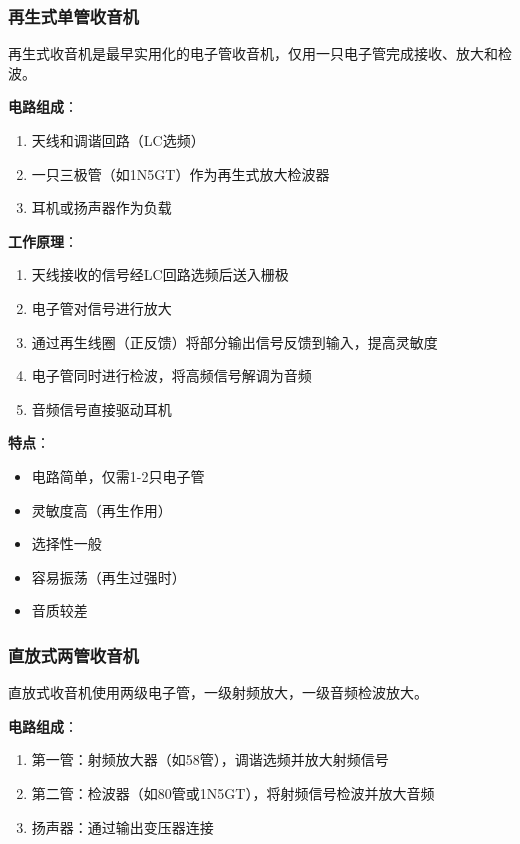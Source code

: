\subsubsection{再生式单管收音机}
\label{sec:regenerative_radio}

再生式收音机是最早实用化的电子管收音机，仅用一只电子管完成接收、放大和检波。

\textbf{电路组成}：
\begin{enumerate}
    \item 天线和调谐回路（LC选频）
    \item 一只三极管（如1N5GT）作为再生式放大检波器
    \item 耳机或扬声器作为负载
\end{enumerate}

\textbf{工作原理}：
\begin{enumerate}
    \item 天线接收的信号经LC回路选频后送入栅极
    \item 电子管对信号进行放大
    \item 通过再生线圈（正反馈）将部分输出信号反馈到输入，提高灵敏度
    \item 电子管同时进行检波，将高频信号解调为音频
    \item 音频信号直接驱动耳机
\end{enumerate}

\textbf{特点}：
\begin{itemize}
    \item 电路简单，仅需1-2只电子管
    \item 灵敏度高（再生作用）
    \item 选择性一般
    \item 容易振荡（再生过强时）
    \item 音质较差
\end{itemize}

\subsubsection{直放式两管收音机}
\label{sec:straight_radio}

直放式收音机使用两级电子管，一级射频放大，一级音频检波放大。

\textbf{电路组成}：
\begin{enumerate}
    \item 第一管：射频放大器（如58管），调谐选频并放大射频信号
    \item 第二管：检波器（如80管或1N5GT），将射频信号检波并放大音频
    \item 扬声器：通过输出变压器连接
\end{enumerate}

